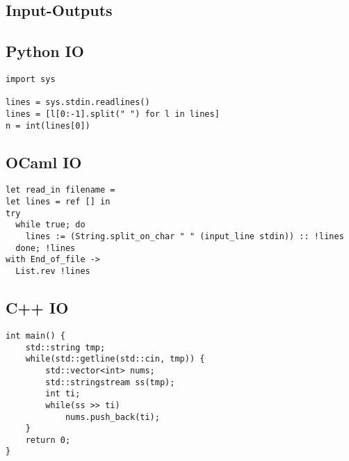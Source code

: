 \documentclass[10pt,a4paper]{article}
\begin{document}
\begin{landscape}
\begin{multicols*}{2}


\section{Input-Outputs}

\subsection{Python IO}

\lstset{style=py}

\begin{lstlisting}
import sys

lines = sys.stdin.readlines()
lines = [l[0:-1].split(" ") for l in lines]
n = int(lines[0])
\end{lstlisting}

\subsection{OCaml IO}

\lstset{style=ocaml}

\begin{lstlisting}
let read_in filename = 
let lines = ref [] in
try
  while true; do
    lines := (String.split_on_char " " (input_line stdin)) :: !lines
  done; !lines
with End_of_file ->
  List.rev !lines
\end{lstlisting}

\subsection{C++ IO}

\begin{lstlisting}
int main() {
    std::string tmp;
    while(std::getline(std::cin, tmp)) {
        std::vector<int> nums;
        std::stringstream ss(tmp);
        int ti;
        while(ss >> ti) 
            nums.push_back(ti);
    }
    return 0;
}
\end{lstlisting}

\lstset{style=cpp}

\end{multicols*}
\end{landscape}
\end{document}
